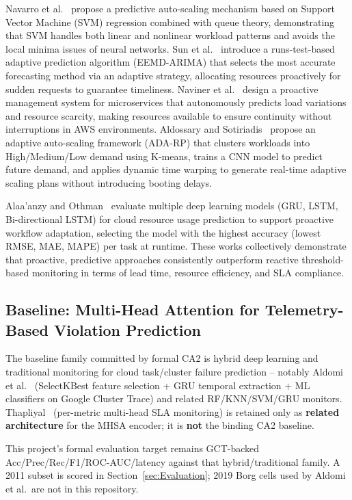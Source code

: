 Navarro et al.~\cite{SVMProvisioning19} propose a predictive auto-scaling mechanism based on Support Vector Machine (SVM) regression combined with queue theory, demonstrating that SVM handles both linear and nonlinear workload patterns and avoids the local minima issues of neural networks. Sun et al.~\cite{ProactiveAllocation21} introduce a runs-test-based adaptive prediction algorithm (EEMD-ARIMA) that selects the most accurate forecasting method via an adaptive strategy, allocating resources proactively for sudden requests to guarantee timeliness. Naviner et al.~\cite{ProactiveMicroservices24} design a proactive management system for microservices that autonomously predicts load variations and resource scarcity, making resources available to ensure continuity without interruptions in AWS environments. Aldossary and Sotiriadis~\cite{AdaptiveAutoscaling23} propose an adaptive auto-scaling framework (ADA-RP) that clusters workloads into High/Medium/Low demand using K-means, trains a CNN model to predict future demand, and applies dynamic time warping to generate real-time adaptive scaling plans without introducing booting delays.

Alaa'anzy and Othman~\cite{MultiModelDL19} evaluate multiple deep learning models (GRU, LSTM, Bi-directional LSTM) for cloud resource usage prediction to support proactive workflow adaptation, selecting the model with the highest accuracy (lowest RMSE, MAE, MAPE) per task at runtime. These works collectively demonstrate that proactive, predictive approaches consistently outperform reactive threshold-based monitoring in terms of lead time, resource efficiency, and SLA compliance.

\subsection{Baseline: Multi-Head Attention for Telemetry-Based Violation Prediction}
\label{subsec:baseline}

The baseline family committed by formal CA2 is hybrid deep learning and traditional monitoring for cloud task/cluster failure prediction -- notably Aldomi et al.~\cite{Aldomi26} (SelectKBest feature selection + GRU temporal extraction + ML classifiers on Google Cluster Trace) and related RF/KNN/SVM/GRU monitors. Thapliyal~\cite{Thapliyal26} (per-metric multi-head SLA monitoring) is retained only as \textbf{related architecture} for the MHSA encoder; it is \textbf{not} the binding CA2 baseline.

This project's formal evaluation target remains GCT-backed Acc/Prec/Rec/F1/ROC-AUC/latency against that hybrid/traditional family. A 2011 subset is scored in Section~\ref{sec:Evaluation}; 2019 Borg cells used by Aldomi et al.\ are not in this repository.

